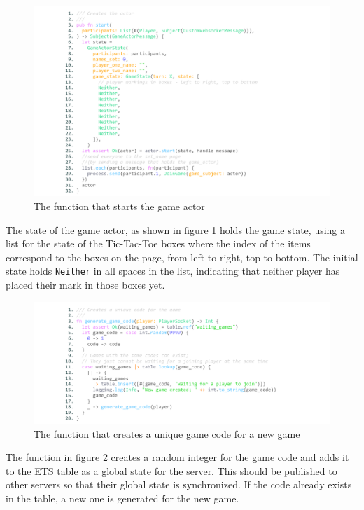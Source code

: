 \documentclass[]{final}
\begin{document}
\begin{figure}[H]
  \centering
  \includegraphics[width=\textwidth]{game_actor_start.pdf}
  \caption{The function that starts the game actor}\label{fig: gameactorstart}
\end{figure}

The state of the game actor, as shown in figure \ref{fig: gameactorstart}
holds the game state, using a list for the state of the Tic-Tac-Toe boxes
where the index of the items correspond to the boxes on the page, from
left-to-right, top-to-bottom. The initial state holds \lstinline|Neither| in
all spaces in the list, indicating that neither player has placed
their mark in those boxes yet.

\begin{figure}[H]
  \centering
  \includegraphics[width=\textwidth]{game_code_gen.pdf}
  \caption{The function that creates a unique game code for a new game}\label{fig: gamecodegen}
\end{figure}

The function in figure \ref{fig: gamecodegen} creates a random integer for the game code
and adds it to the ETS table as a global state for the server. This should be
published to other servers so that their global state is synchronized. If the
code already exists in the table, a new one is generated for the new game.
\end{document}
